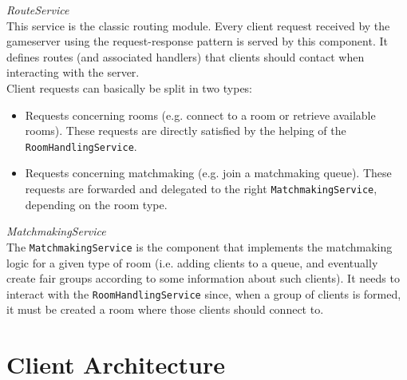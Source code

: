 \bigskip
\textit{RouteService}
\\
This service is the classic routing module.
Every client request received by the gameserver using the request-response pattern is served by this component.
It defines routes (and associated handlers) that clients should contact when interacting with the server.
\\
Client requests can basically be split in two types:
\begin{itemize}
	\item Requests concerning rooms (e.g. connect to a room or retrieve available rooms). These requests are directly satisfied by the helping of the \texttt{RoomHandlingService}.
	\item Requests concerning matchmaking (e.g. join a matchmaking queue). These requests are forwarded and delegated to the right \texttt{MatchmakingService}, depending on the room type.
\end{itemize}

\bigskip
\textit{MatchmakingService}
\\
The \texttt{MatchmakingService} is the component that implements the matchmaking logic for a given type of room (i.e. adding clients to a queue, and eventually create fair groups according to some information about such clients). It needs to interact with the \texttt{RoomHandlingService} since, when a group of clients is formed, it must be created a room where those clients should connect to.


\section{Client Architecture}

